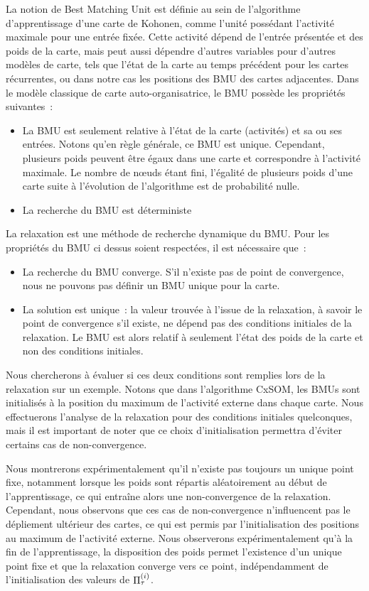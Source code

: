\documentclass[../main]{subfiles}
\begin{document}
La notion de Best Matching Unit est définie au sein de l'algorithme d'apprentissage d'une carte de Kohonen, comme l'unité possédant l'activité maximale pour une entrée fixée. 
Cette activité dépend de l'entrée présentée et des poids de la carte, mais peut aussi dépendre d'autres variables pour d'autres modèles de carte, tels que l'état de la carte au temps précédent pour les cartes récurrentes, ou dans notre cas les positions des BMU des cartes adjacentes.
Dans le modèle classique de carte auto-organisatrice, le BMU possède les propriétés suivantes~:
\begin{itemize}
	\item La BMU est seulement relative à l'état de la carte (activités) et sa ou ses entrées. Notons qu'en règle générale, ce BMU est unique. Cependant, plusieurs poids peuvent être égaux dans une carte et correspondre à l'activité maximale. Le nombre de n\oe{}uds étant fini, l'égalité de plusieurs poids d'une carte suite à l'évolution de l'algorithme est de probabilité nulle.
	\item La recherche du BMU est déterministe
\end{itemize}

La relaxation est une méthode de recherche dynamique du BMU. Pour les propriétés du BMU ci dessus soient respectées, il est nécessaire que~:

\begin{itemize}
	\item La recherche du BMU converge. S'il n'existe pas de point de convergence, nous ne pouvons pas définir un BMU unique pour la carte.
	\item La solution est unique~: la valeur trouvée à l'issue de la relaxation, à savoir le point de convergence s'il existe, ne dépend pas des conditions initiales de la relaxation. Le BMU est alors relatif à seulement l'état des poids de la carte et non des conditions initiales.
\end{itemize}

Nous chercherons à évaluer si ces deux conditions sont remplies lors de la relaxation sur un exemple.
Notons que dans l'algorithme CxSOM, les BMUs sont initialisés à la position du maximum de l'activité externe dans chaque carte. 
Nous effectuerons l'analyse de la relaxation pour des conditions initiales quelconques, mais il est important de noter que ce choix d'initialisation permettra d'éviter certains cas de non-convergence.

Nous montrerons expérimentalement qu'il n'existe pas toujours un unique point fixe, notamment lorsque les poids sont répartis aléatoirement au début de l'apprentissage, ce qui entraîne alors une non-convergence de la relaxation. 
Cependant, nous observons que ces cas de non-convergence n'influencent pas le dépliement ultérieur des cartes, ce qui est permis par l'initialisation des positions au maximum de l'activité externe.
Nous observerons expérimentalement qu'à la fin de l'apprentissage, la disposition des poids permet l'existence d'un unique point fixe et que la relaxation converge vers ce point, indépendamment de l'initialisation des valeurs de $\Pi^{({i})}_{\tau}$.
\end{document}
